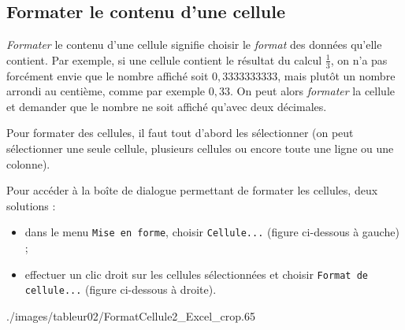 

\subsection{Formater le contenu d'une cellule}\label{Calc2FormaterCellule} 

\emph{Formater} le contenu d'une cellule signifie choisir le \emph{format} des données qu'elle contient. Par exemple, si une cellule contient le résultat du calcul $\frac{1}{3}$, on n'a pas forcément envie que le nombre affiché soit $0,3333333333$, mais plutôt un nombre arrondi au centième, comme par exemple $0,33$. On peut alors \emph{formater} la cellule et demander que le nombre ne soit affiché qu'avec deux décimales.

Pour formater des cellules, il faut tout d'abord les sélectionner (on peut sélectionner une seule cellule, plusieurs cellules ou encore toute une ligne ou une colonne).



Pour accéder à la boîte de dialogue permettant de formater les cellules, deux solutions :
\begin{itemize}
\item dans le menu \texttt{Mise en forme}, choisir \texttt{Cellule...} (figure ci-dessous à gauche) ;    
\item effectuer un clic droit sur les cellules sélectionnées et choisir \texttt{Format de cellule...} (figure ci-dessous à droite).
\end{itemize}

%  
              {./images/tableur02/FormatCellule2_Excel_crop}{.65\textwidth}

